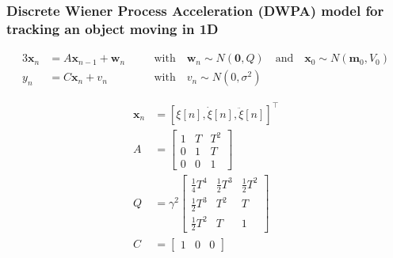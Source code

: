 \begin{frame}
    \frametitle{Discrete Wiener Process Acceleration (DWPA) model for tracking
    an object moving in 1D}

    \small

    \begin{alignat*}{3}
        \mathbf{x}_n &= A\mathbf{x}_{n-1} + \mathbf{w}_n && \quad \text{with} \quad\mathbf{w}_n\sim N(\mathbf{0}, Q) \quad \text{and} \quad\mathbf{x}_0\sim N(\mathbf{m}_0, V_0)\\
        y_n &= C\mathbf{x}_{n} + v_n                     && \quad \text{with} \quad v_n\sim N(0, \sigma^2)
    \end{alignat*}

    \begin{align*}
        \mathbf{x}_n&=\left[\xi[n],\dot{\xi}[n],\ddot{\xi}[n]\right]^\intercal\\
        A&=\begin{bmatrix}
            1 & T & T^2\\
            0 & 1 & T\\
            0 & 0 & 1
        \end{bmatrix}\\
        Q&=\gamma^2\begin{bmatrix}
            \frac{1}{4}T^4&\frac{1}{2}T^3&\frac{1}{2}T^2\\
            \frac{1}{2}T^3&T^2&T\\
            \frac{1}{2}T^2&T&1
        \end{bmatrix}\\
        C&=\begin{bmatrix}
            1 & 0 &0
        \end{bmatrix}
    \end{align*}

    \normalsize

\end{frame}

